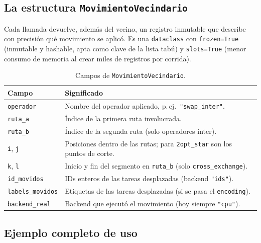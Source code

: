 \subsection{La estructura \texttt{MovimientoVecindario}}
\label{subsec:movimiento}

Cada llamada devuelve, además del vecino, un registro inmutable que
describe con precisión qué movimiento se aplicó. Es una \texttt{dataclass}
con \texttt{frozen=True} (inmutable y hashable, apta como clave de la lista
tabú) y \texttt{slots=True} (menor consumo de memoria al crear miles de
registros por corrida).

\begin{table}[h]
\centering
\caption{Campos de \texttt{MovimientoVecindario}.}
\label{tab:movimiento}
\small
\begin{tabular}{lp{9.5cm}}
\toprule
Campo & Significado \\
\midrule
\texttt{operador}        & Nombre del operador aplicado, p.\,ej.\ \texttt{"swap\_inter"}. \\
\texttt{ruta\_a}         & Índice de la primera ruta involucrada. \\
\texttt{ruta\_b}         & Índice de la segunda ruta (solo operadores inter). \\
\texttt{i}, \texttt{j}   & Posiciones dentro de las rutas; para \texttt{2opt\_star} son los puntos de corte. \\
\texttt{k}, \texttt{l}   & Inicio y fin del segmento en \texttt{ruta\_b} (solo \texttt{cross\_exchange}). \\
\texttt{id\_movidos}     & IDs enteros de las tareas desplazadas (backend \texttt{"ids"}). \\
\texttt{labels\_movidos} & Etiquetas de las tareas desplazadas (si se pasa el \texttt{encoding}). \\
\texttt{backend\_real}   & Backend que ejecutó el movimiento (hoy siempre \texttt{"cpu"}). \\
\bottomrule
\end{tabular}
\end{table}

\subsection{Ejemplo completo de uso}
\label{subsec:ejemplo-vecino}

